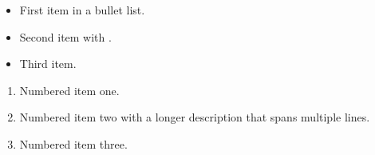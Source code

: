 \lipsum[1]

\begin{itemize}
  \item First item in a bullet list.
  \item Second item with \lipsum[3][1].
  \item Third item.
\end{itemize}

\lipsum[4]

\begin{enumerate}
  \item Numbered item one.
  \item Numbered item two with a longer description
        that spans multiple lines.
  \item Numbered item three.
\end{enumerate}

\lipsum[5][1-3]
